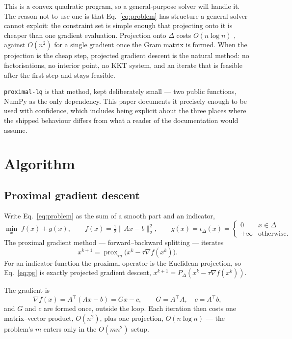 \documentclass[11pt,a4paper]{article}
\newcommand{\code}[1]{\texttt{#1}}
\newcommand{\simplex}{\Delta}
\begin{document}
This is a convex quadratic program, so a general-purpose solver
\citep{diamond2016} will handle it. The reason not to use one is that
Eq.~\eqref{eq:problem} has structure a general solver cannot exploit: the
constraint set is simple enough that projecting onto it is cheaper than one
gradient evaluation. Projection onto $\simplex$ costs $O(n \log n)$
\citep{duchi2008}, against $O(n^2)$ for a single gradient once the Gram matrix
is formed. When the projection is the cheap step, projected gradient descent is
the natural method: no factorisations, no interior point, no KKT system, and an
iterate that is feasible after the first step and stays feasible.

\code{proximal-lq} is that method, kept deliberately small --- two public
functions, NumPy \citep{harris2020} as the only dependency. This paper documents
it precisely enough to be used with confidence, which includes being explicit
about the three places where the shipped behaviour differs from what a reader of
the documentation would assume.

\section{Algorithm}

\subsection{Proximal gradient descent}

Write Eq.~\eqref{eq:problem} as the sum of a smooth part and an indicator,
\begin{equation}
  \min_x \; f(x) + g(x),
  \qquad
  f(x) = \tfrac{1}{2}\|Ax-b\|_2^2,
  \qquad
  g(x) = \iota_{\simplex}(x) =
  \begin{cases}
    0 & x \in \simplex \\
    +\infty & \text{otherwise.}
  \end{cases}
\end{equation}
The proximal gradient method --- forward--backward splitting
\citep{parikh2014} --- iterates
\begin{equation}
  x^{k+1} = \operatorname{prox}_{\tau g}\bigl( x^k - \tau \nabla f(x^k) \bigr).
  \label{eq:pg}
\end{equation}
For an indicator function the proximal operator is the Euclidean projection, so
Eq.~\eqref{eq:pg} is exactly projected gradient descent,
$x^{k+1} = P_{\simplex}(x^k - \tau \nabla f(x^k))$.

The gradient is
\begin{equation}
  \nabla f(x) = A^{\top}(Ax - b) = G x - c,
  \qquad G = A^{\top} A, \quad c = A^{\top} b,
\end{equation}
and $G$ and $c$ are formed once, outside the loop. Each iteration then costs one
matrix--vector product, $O(n^2)$, plus one projection, $O(n \log n)$ --- the
problem's $m$ enters only in the $O(mn^2)$ setup.
\end{document}
